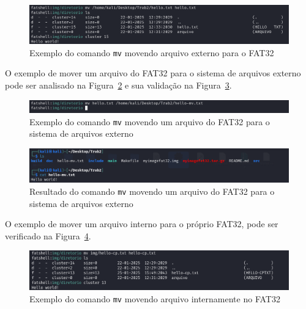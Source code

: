 \documentclass[
    12pt,				%
    oneside,   	        %
    a4paper,			%
    english,			%
    french,				%
    spanish,			%
    brazil,				%
    ]{pacotes/abntex2}
\begin{document}
\begin{figure}[H]
    \centering
    \includegraphics[width=450pt]{figuras/resultados/12-mv-externo-iterno.PNG}
    \caption{Exemplo do comando \texttt{mv} movendo arquivo externo para o FAT32}
    \label{fig:mv-externo-interno}
\end{figure}

O exemplo de mover um arquivo do FAT32 para o sistema de arquivos externo pode ser analisado na Figura~\ref{fig:mv-interno-externo} e sua validação na Figura~\ref{fig:mv-externo-validacao}.

\begin{figure}[H]
    \centering
    \includegraphics[width=450pt]{figuras/resultados/13-mv-interno-externo.PNG}
    \caption{Exemplo do comando \texttt{mv} movendo um arquivo do FAT32 para o sistema de arquivos externo}
    \label{fig:mv-interno-externo}
\end{figure}

\begin{figure}[H]
    \centering
    \includegraphics[width=450pt]{figuras/resultados/14-mv-externo-validacao.PNG}
    \caption{Resultado do comando \texttt{mv} movendo um arquivo do FAT32 para o sistema de arquivos externo}
    \label{fig:mv-externo-validacao}
\end{figure}

O exemplo de mover um arquivo interno para o próprio FAT32, pode ser verificado na Figura~\ref{fig:mv-interno}.

\begin{figure}[H]
    \centering
    \includegraphics[width=450pt]{figuras/resultados/18-mv-interno-interno.PNG}
    \caption{Exemplo do comando \texttt{mv} movendo arquivo internamente no FAT32}
    \label{fig:mv-interno}
\end{figure}
\end{document}
